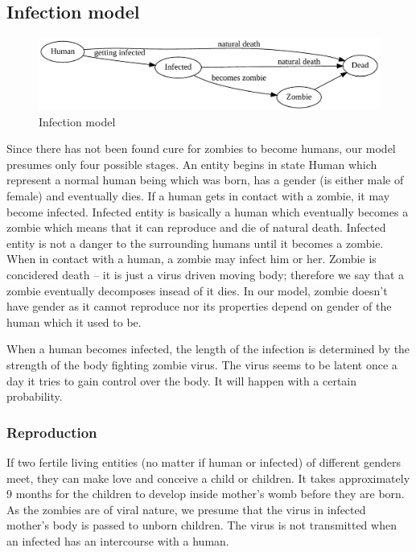 \documentclass[a4paper]{article}
\begin{document}
\subsection{Infection model}

\begin{figure}[ht]
        \centering
        \includegraphics[width=\textwidth]{model}
        \caption{Infection model}
\end{figure}

Since there has not been found cure for zombies to become humans, our model presumes only four possible stages.
An entity begins in state Human which represent a normal human being which was born, has a gender (is either male of female) and eventually dies.
If a human gets in contact with a zombie, it may become infected.
Infected entity is basically a human which eventually becomes a zombie which means that it can reproduce and die of natural death.
Infected entity is not a danger to the surrounding humans until it becomes a zombie.
When in contact with a human, a zombie may infect him or her.
Zombie is concidered death -- it is just a virus driven moving body; therefore we say that a zombie eventually decomposes insead of it dies.
In our model, zombie doesn't have gender as it cannot reproduce nor its properties depend on gender of the human which it used to be.

When a human becomes infected, the length of the infection is determined by the strength of the body fighting zombie virus.
The virus seems to be latent once a day it tries to gain control over the body.
It will happen with a certain probability.

\subsubsection{Reproduction}

If two fertile living entities (no matter if human or infected) of different genders meet, they can make love and conceive a child or children.
It takes approximately 9 months for the children to develop inside mother's womb before they are born.
As the zombies are of viral nature, we presume that the virus in infected mother's body is passed to unborn children.
The virus is not transmitted when an infected has an intercourse with a human.
\end{document}
